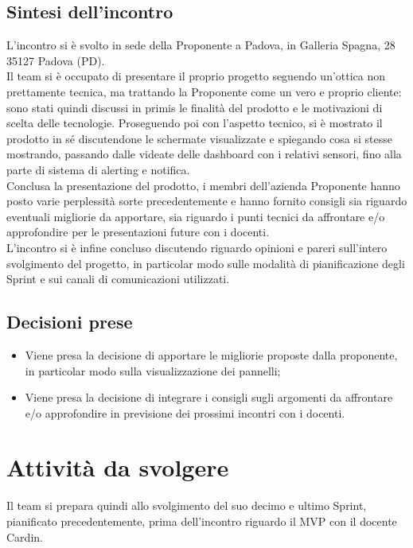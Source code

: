 \documentclass[8pt]{article}
\newcommand{\signatureline}[1]{%
	 \par\vspace{0.5cm}
	\noindent\makebox[\linewidth][r]{\rule{0.2\textwidth}{0.5pt}\hspace{3cm}\makebox[0pt][r]{\vspace{3pt}\footnotesize #1}}%
}
\begin{document}
\subsection{Sintesi dell'incontro}
L'incontro si è svolto in sede della Proponente a Padova, in Galleria Spagna, 28 35127 Padova (PD). \\
Il team si è occupato di presentare il proprio progetto seguendo un'ottica non prettamente tecnica, ma trattando la Proponente come un vero e proprio cliente: sono stati quindi discussi in primis le finalità del prodotto e le motivazioni di scelta delle tecnologie. Proseguendo poi con l'aspetto tecnico, si è mostrato il prodotto in sé discutendone le schermate visualizzate e spiegando cosa si stesse mostrando, passando dalle videate delle dashboard con i relativi sensori, fino alla parte di sistema di alerting e notifica.\\
Conclusa la presentazione del prodotto, i membri dell'azienda Proponente hanno posto varie perplessità sorte precedentemente e hanno fornito consigli sia riguardo eventuali migliorie da apportare, sia riguardo i punti tecnici da affrontare e/o approfondire per le presentazioni future con i docenti.\\
L'incontro si è infine concluso discutendo riguardo opinioni e pareri sull'intero svolgimento del progetto, in particolar modo sulle modalità di pianificazione degli Sprint e sui canali di comunicazioni utilizzati.
\subsection{Decisioni prese}
\begin{itemize}
	\setlength\itemsep{0em}
	\item Viene presa la decisione di apportare le migliorie proposte dalla proponente, in particolar modo sulla visualizzazione dei pannelli;
	\item Viene presa la decisione di integrare i consigli sugli argomenti da affrontare e/o approfondire in previsione dei prossimi incontri con i docenti.
\end{itemize}
\section{Attività da svolgere}
Il team si prepara quindi allo svolgimento del suo decimo e ultimo Sprint, pianificato precedentemente, prima dell'incontro riguardo il MVP con il docente Cardin.
\signatureline{Padova, 2024-08-15}
\end{document}
